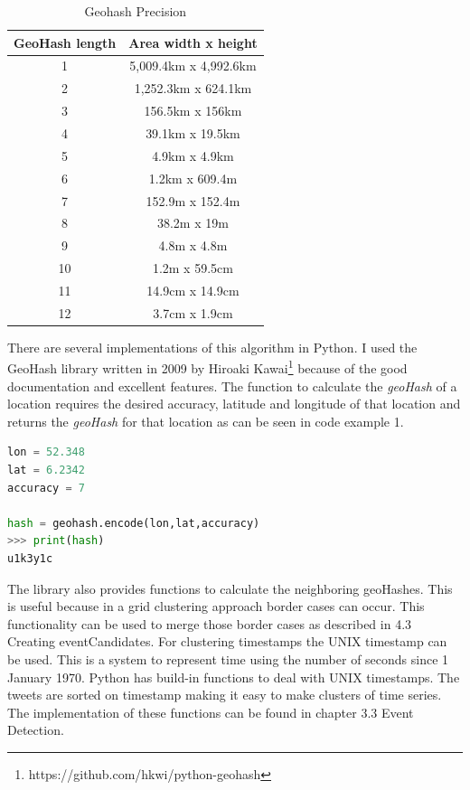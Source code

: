 \documentclass[
10pt, %
a4paper, %
oneside, %
headinclude,footinclude, %
BCOR5mm, %
]{scrartcl}
\begin{document}
\begin{table}[h]
\caption[Geohash Precision]{Geohash Precision}
\begin{tabular}{|c|c|}
\hline
GeoHash length & Area width x height   \\ \hline
1              & 5,009.4km x 4,992.6km \\ \hline
2              & 1,252.3km x 624.1km   \\ \hline
3              & 156.5km x 156km       \\ \hline
4              & 39.1km x 19.5km       \\ \hline
5              & 4.9km x 4.9km         \\ \hline
6              & 1.2km x 609.4m        \\ \hline
7              & 152.9m x 152.4m       \\ \hline
8              & 38.2m x 19m           \\ \hline
9              & 4.8m x 4.8m           \\ \hline
10             & 1.2m x 59.5cm         \\ \hline
11             & 14.9cm x 14.9cm       \\ \hline
12             & 3.7cm x 1.9cm         \\ \hline
\end{tabular}
\end{table}
\newpage
There are several implementations of this algorithm in Python. I used the GeoHash library written in 2009 by Hiroaki Kawai\footnote{https://github.com/hkwi/python-geohash} because of the good documentation and excellent features. The function to calculate the \textit{geoHash} of a location requires the desired accuracy, latitude and longitude of that location and returns the \textit{geoHash} for that location as can be seen in code example 1. \vl

\begin{lstlisting}[language=Python, caption=Example of geoHash encoding]
lon = 52.348
lat = 6.2342
accuracy = 7

hash = geohash.encode(lon,lat,accuracy)
>>> print(hash)
u1k3y1c
\end{lstlisting}
The library also provides functions to calculate the neighboring geoHashes. This is useful because in a grid clustering approach border cases can occur.  This functionality can be used to merge those border cases as described in 4.3 Creating eventCandidates. \vl
For clustering timestamps the UNIX timestamp can be used. This is a system to represent time using the number of seconds since 1 January 1970. Python has build-in functions to deal with UNIX timestamps. The tweets are sorted on timestamp making it easy to make clusters of time series. The implementation of these functions can be found in chapter 3.3 Event Detection.
\end{document}
